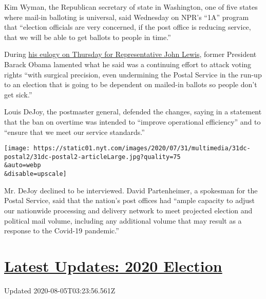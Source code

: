Kim Wyman, the Republican secretary of state in Washington, one of five
states where mail-in balloting is universal, said Wednesday on NPR's
``1A'' program that ``election officials are very concerned, if the post
office is reducing service, that we will be able to get ballots to
people in time.''

During
\href{https://www.nytimes.com/2020/07/30/us/obama-eulogy-john-lewis-full-transcript.html}{his
eulogy on Thursday for Representative John Lewis}, former President
Barack Obama lamented what he said was a continuing effort to attack
voting rights ``with surgical precision, even undermining the Postal
Service in the run-up to an election that is going to be dependent on
mailed-in ballots so people don't get sick.''

Louis DeJoy, the postmaster general, defended the changes, saying in a
statement that the ban on overtime was intended to ``improve operational
efficiency'' and to ``ensure that we meet our service standards.''

\texttt{[image: https://static01.nyt.com/images/2020/07/31/multimedia/31dc-postal2/31dc-postal2-articleLarge.jpg?quality=75\\\&auto=webp\\\&disable=upscale]}

Mr. DeJoy declined to be interviewed. David Partenheimer, a spokesman
for the Postal Service, said that the nation's post offices had ``ample
capacity to adjust our nationwide processing and delivery network to
meet projected election and political mail volume, including any
additional volume that may result as a response to the Covid-19
pandemic.''

\hypertarget{latest-updates-2020-election}{%
\section{\texorpdfstring{\href{https://www.nytimes.com/2020/08/04/us/elections/primary-election-michigan-arizona-kansas.html?action=click\&pgtype=Article\&state=default\&region=MAIN_CONTENT_1\&context=storylines_live_updates}{Latest
Updates: 2020
Election}}{Latest Updates: 2020 Election}}\label{latest-updates-2020-election}}

Updated 2020-08-05T03:23:56.561Z

